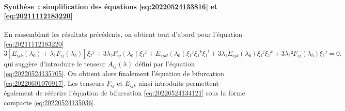 \documentclass[12pt, final]{scrartcl}
\theoremstyle{definition}
\begin{document}
\paragraph{Synthèse~: simplification des équations \eqref{eq:20220524133816} et
  \eqref{eq:20211112183220}} En rassemblant les résultats précédents, on obtient
tout d'abord pour l'équation \eqref{eq:20211112183220}
\begin{equation}
  3 [E_{i j k}(λ₀) + λ₁ F_{i j} (λ₀)] ξ₂^j + 3 λ₂ F_{i j}(λ₀) ξ₁^j + E_{i j k l}(λ₀) ξ₁^j ξ₁^k ξ₁^l + 3 λ₁ \dot{E}_{i j k} (λ₀) ξ₁^j ξ₁^k + 3 λ₁² \dot{F}_{i j}(λ₀) ξ₁^j = 0,
\end{equation}
qui suggère d'introduire le tenseur \(A_{i j}(λ)\) défini par l'équation
\eqref{eq:20220524135705}. On obtient alors finalement l'équation de bifurcation
\eqref{eq:20220601070917}. Les tenseurs \(F_{i j}\) et \(E_{i j k}\) ainsi
introduits permettent également de réécrire l'équation de bifurcation
\eqref{eq:20220524134121} sous la forme compacte \eqref{eq:20220524135036}.
\end{document}
